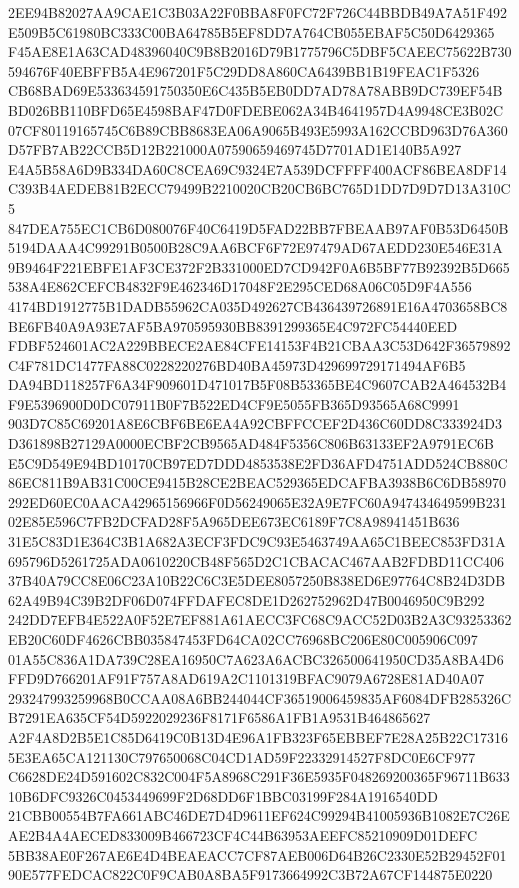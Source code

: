 \documentclass[UTF8,fontset=fandol,zihao=-4,a4paper]{ctexart}
\begin{document}
{{2EE94B82027AA9CAE1C3B03A22F0BBA8F0FC72F726C44BBDB49A7A51F492E509B5C61980BC333C00BA64785B5EF8DD7A764CB055EBAF5C50D6429365
F45AE8E1A63CAD48396040C9B8B2016D79B1775796C5DBF5CAEEC75622B730594676F40EBFFB5A4E967201F5C29DD8A860CA6439BB1B19FEAC1F5326
CB68BAD69E533634591750350E6C435B5EB0DD7AD78A78ABB9DC739EF54BBD026BB110BFD65E4598BAF47D0FDEBE062A34B4641957D4A9948CE3B02C
07CF80119165745C6B89CBB8683EA06A9065B493E5993A162CCBD963D76A360D57FB7AB22CCB5D12B221000A07590659469745D7701AD1E140B5A927
E4A5B58A6D9B334DA60C8CEA69C9324E7A539DCFFFF400ACF86BEA8DF14C393B4AEDEB81B2ECC79499B2210020CB20CB6BC765D1DD7D9D7D13A310C5
847DEA755EC1CB6D080076F40C6419D5FAD22BB7FBEAAB97AF0B53D6450B5194DAAA4C99291B0500B28C9AA6BCF6F72E97479AD67AEDD230E546E31A
9B9464F221EBFE1AF3CE372F2B331000ED7CD942F0A6B5BF77B92392B5D665538A4E862CEFCB4832F9E462346D17048F2E295CED68A06C05D9F4A556
4174BD1912775B1DADB55962CA035D492627CB436439726891E16A4703658BC8BE6FB40A9A93E7AF5BA970595930BB8391299365E4C972FC54440EED
FDBF524601AC2A229BBECE2AE84CFE14153F4B21CBAA3C53D642F36579892C4F781DC1477FA88C0228220276BD40BA45973D429699729171494AF6B5
DA94BD118257F6A34F909601D471017B5F08B53365BE4C9607CAB2A464532B4F9E5396900D0DC07911B0F7B522ED4CF9E5055FB365D93565A68C9991
903D7C85C69201A8E6CBF6BE6EA4A92CBFFCCEF2D436C60DD8C333924D3D361898B27129A0000ECBF2CB9565AD484F5356C806B63133EF2A9791EC6B
E5C9D549E94BD10170CB97ED7DDD4853538E2FD36AFD4751ADD524CB880C86EC811B9AB31C00CE9415B28CE2BEAC529365EDCAFBA3938B6C6DB58970
292ED60EC0AACA42965156966F0D56249065E32A9E7FC60A947434649599B23102E85E596C7FB2DCFAD28F5A965DEE673EC6189F7C8A98941451B636
31E5C83D1E364C3B1A682A3ECF3FDC9C93E5463749AA65C1BEEC853FD31A695796D5261725ADA0610220CB48F565D2C1CBACAC467AAB2FDBD11CC406
37B40A79CC8E06C23A10B22C6C3E5DEE8057250B838ED6E97764C8B24D3DB62A49B94C39B2DF06D074FFDAFEC8DE1D262752962D47B0046950C9B292
242DD7EFB4E522A0F52E7EF881A61AECC3FC68C9ACC52D03B2A3C93253362EB20C60DF4626CBB035847453FD64CA02CC76968BC206E80C005906C097
01A55C836A1DA739C28EA16950C7A623A6ACBC326500641950CD35A8BA4D6FFD9D766201AF91F757A8AD619A2C1101319BFAC9079A6728E81AD40A07
293247993259968B0CCAA08A6BB244044CF36519006459835AF6084DFB285326CB7291EA635CF54D5922029236F8171F6586A1FB1A9531B464865627
A2F4A8D2B5E1C85D6419C0B13D4E96A1FB323F65EBBEF7E28A25B22C173165E3EA65CA121130C797650068C04CD1AD59F22332914527F8DC0E6CF977
C6628DE24D591602C832C004F5A8968C291F36E5935F048269200365F96711B63310B6DFC9326C0453449699F2D68DD6F1BBC03199F284A1916540DD
21CBB00554B7FA661ABC46DE7D4D9611EF624C99294B41005936B1082E7C26EAE2B4A4AECED833009B466723CF4C44B63953AEEFC85210909D01DEFC
5BB38AE0F267AE6E4D4BEAEACC7CF87AEB006D64B26C2330E52B29452F0190E577FEDCAC822C0F9CAB0A8BA5F9173664992C3B72A67CF144875E0220
}}
\end{document}
